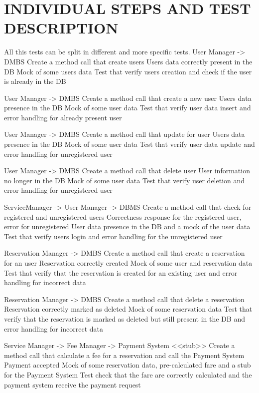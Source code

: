 \section{INDIVIDUAL STEPS AND TEST DESCRIPTION}

All this tests can be split in different and more specific tests. 
\teststep 
{User Manager -> DMBS}
{Create a method call that create users }
{Users data correctly present in the DB}
{Mock of some users data }
{Test that verify users creation and check if the user is already in the DB}

\teststep 
{User Manager -> DMBS}
{Create a method call that create a new user }
{Users data presence in the DB}
{Mock of some user data }
{Test that verify user data insert and error handling for already present user}

\teststep 
{User Manager -> DMBS}
{Create a method call that update for user }
{Users data presence in the DB}
{Mock of some user data }
{Test that verify user data update and error handling for unregistered user}

\teststep 
{User Manager -> DMBS}
{Create a method call that delete user }
{User information no longer in the DB}
{Mock of some user data }
{Test that verify user deletion and error handling for unregistered user}



\teststep
{ServiceManager -> User Manager -> DBMS}
{Create a method call that check for registered and unregistered users}
{Correctness response for the registered user, error for unregistered}
{User data presence in the DB and a mock of  the user data }
{Test that verify users login and error handling for the unregistered user}



\teststep 
{Reservation Manager -> DMBS}
{Create a method call that create a reservation for an user }
{Reservation correctly created}
{Mock of some user and reservation data }
{Test that verify that the reservation is created for an existing user and error handling for incorrect data }

\teststep 
{Reservation Manager -> DMBS}
{Create a method call that delete a reservation  }
{Reservation correctly marked as deleted}
{Mock of some reservation data }
{Test that verify that the reservation is marked as deleted but still present in the DB and error handling for incorrect data }



\teststep 
{Service Manager -> Fee Manager -> Payment System <<stub>>}
{Create a method call that calculate a fee for a reservation and call the Payment System }
{Payment accepted}
{Mock of some reservation data, pre-calculated fare and a stub for the Payment System }
{Test check that the fare are correctly calculated and the payment system receive the payment request}

